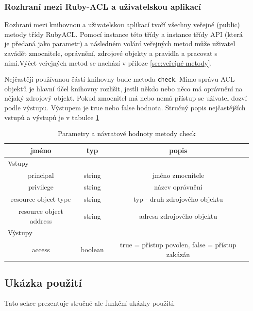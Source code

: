 
\subsubsection{Rozhraní mezi Ruby-ACL a uživatelskou aplikací}
Rozhraní mezi knihovnou a uživatelskou aplikací tvoří všechny veřejné (public) metody třídy RubyACL. Pomocí instance této třídy a instance třídy API (která je předaná jako parametr) a následném volání veřejných metod může uživatel zavádět zmocnitele, oprávnění, zdrojové objekty a pravidla a pracovat s nimi.Výčet veřejných metod se nachází v příloze \ref{sec:veřejné metody}.

Nejčastěji používanou částí knihovny bude metoda \verb|check|. Mimo správu ACL objektů je hlavní účel knihovny rozlišit, jestli někdo nebo něco má oprávnění na nějaký zdrojový objekt. Pokud zmocnitel má nebo nemá přístup se uživatel dozví podle výstupu. Výstupem je true nebo false hodnota. Stručný popis nejčastějších vstupů a výstupů je v tabulce \ref{tab:tab3}

\begin{table}%
\centering
\begin{tabular}{|c|c|c|}
\hline
\textbf{jméno} & \textbf{typ} & \textbf{popis}\\
\hline
\multicolumn{3}{|l|}{Vstupy} \\
\hline
principal & string & jméno zmocnitele\\
\hline
privilege & string & název oprávnění\\
\hline
resource object type & string & typ - druh zdrojového objektu\\
\hline
resource object address & string & adresa zdrojového objektu\\
\hline
\hline
\multicolumn{3}{|l|}{Výstupy} \\
\hline
access & boolean & true = přístup povolen, false = přístup zakázán\\
\hline
\end{tabular}
\caption{Parametry a návratové hodnoty metody check} %
\label{tab:tab3}
\end{table}


\subsection{Ukázka použití}
Tato sekce prezentuje stručné ale funkční ukázky použití.

